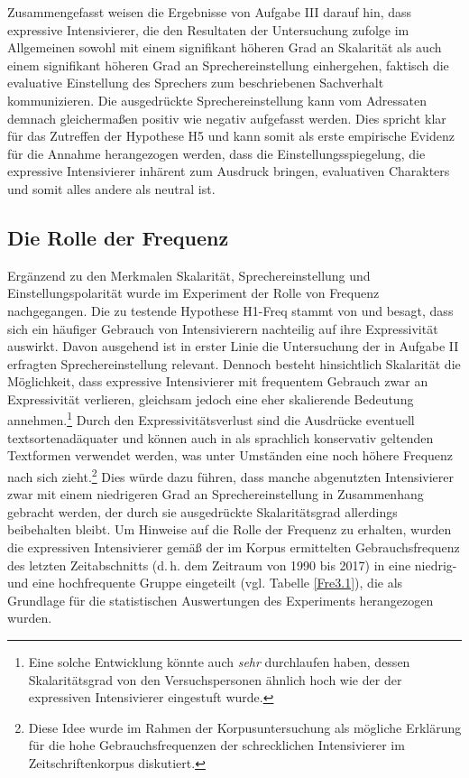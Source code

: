 Zusammengefasst weisen die Ergebnisse von Aufgabe III darauf hin, dass expressive Intensivierer, die den Resultaten der Untersuchung zufolge im Allgemeinen sowohl mit einem signifikant höheren Grad an Skalarität als auch einem signifikant höheren Grad an Sprechereinstellung einhergehen, faktisch die evaluative Einstellung des Sprechers zum beschriebenen Sachverhalt kommunizieren. Die ausgedrückte Sprechereinstellung kann vom Adressaten demnach gleichermaßen positiv wie negativ aufgefasst werden. Dies spricht klar für das Zutreffen der Hypothese H5 und kann somit als erste empirische Evidenz für die Annahme herangezogen werden, dass die Einstellungsspiegelung, die expressive Intensivierer inhärent zum Ausdruck bringen, evaluativen Charakters und somit alles andere als neutral ist.





\subsection{Die Rolle der Frequenz}

\largerpage
Ergänzend zu den Merkmalen Skalarität, Sprechereinstellung und Einstellungspolarität wurde im Experiment der Rolle von Frequenz nachgegangen. Die zu testende Hypothese {H1-Freq} stammt von {\citet[2]{Hauschild.1899}} und besagt, dass sich ein häufiger Gebrauch von Intensivierern nachteilig auf ihre Expressivität auswirkt. Davon ausgehend ist in erster Linie die Untersuchung der in Aufgabe II erfragten Sprechereinstellung relevant. Dennoch besteht hinsichtlich Skalarität die Möglichkeit, dass expressive Intensivierer mit frequentem Gebrauch zwar an Expressivität verlieren, gleichsam jedoch eine eher skalierende Bedeutung annehmen.\footnote{Eine solche Entwicklung könnte auch \textit{sehr} durchlaufen haben, dessen Skalaritätsgrad von den Versuchspersonen ähnlich hoch wie der der expressiven Intensivierer {eingestuft wurde}.} Durch den Expressivitätsverlust sind die Ausdrücke eventuell textsortenadäquater und können auch in als sprachlich konservativ geltenden Textformen verwendet werden, was unter Umständen eine noch höhere Frequenz nach sich zieht.\footnote{Diese Idee wurde im Rahmen der Korpusuntersuchung als mögliche Erklärung für die hohe Gebrauchsfrequenzen der \glqq{}schrecklichen\grqq{} Intensivierer im Zeitschriftenkorpus diskutiert.} Dies würde dazu führen, dass manche abgenutzten Intensivierer zwar mit einem niedrigeren Grad an Sprechereinstellung in Zusammenhang gebracht werden, der durch sie ausgedrückte Skalaritätsgrad allerdings beibehalten bleibt. Um Hinweise auf die Rolle der Frequenz zu erhalten, wurden die expressiven Intensivierer gemäß der im Korpus ermittelten Gebrauchsfrequenz des letzten Zeitabschnitts (d.\,h. dem Zeitraum von 1990 bis 2017) in eine niedrig- und eine hochfrequente Gruppe eingeteilt (vgl. Tabelle \ref{Fre3.1}), die als Grundlage für die statistischen Auswertungen des Experiments {herangezogen wurden}.



